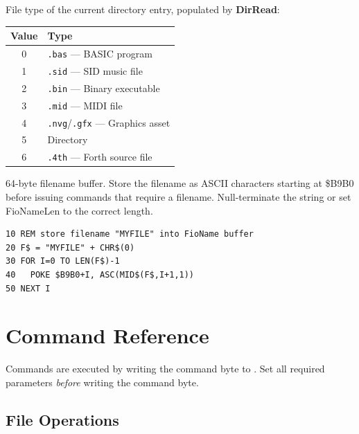 
File type of the current directory entry, populated by \textbf{DirRead}:

\begin{center}
\small
\begin{tabular}{@{}cl@{}}
\toprule
\textbf{Value} & \textbf{Type} \\
\midrule
0 & \texttt{.bas} --- BASIC program \\
1 & \texttt{.sid} --- SID music file \\
2 & \texttt{.bin} --- Binary executable \\
3 & \texttt{.mid} --- MIDI file \\
4 & \texttt{.nvg}/\texttt{.gfx} --- Graphics asset \\
5 & Directory \\
6 & \texttt{.4th} --- Forth source file \\
\bottomrule
\end{tabular}
\end{center}



64-byte filename buffer.  Store the filename as ASCII characters starting at
\$B9B0 before issuing commands that require a filename.  Null-terminate the
string or set FioNameLen to the correct length.

\begin{lstlisting}
10 REM store filename "MYFILE" into FioName buffer
20 F$ = "MYFILE" + CHR$(0)
30 FOR I=0 TO LEN(F$)-1
40   POKE $B9B0+I, ASC(MID$(F$,I+1,1))
50 NEXT I
\end{lstlisting}


\section{Command Reference}
\label{sec:fio-commands}

Commands are executed by writing the command byte to .  Set all
required parameters \emph{before} writing the command byte.

\subsection{File Operations}

